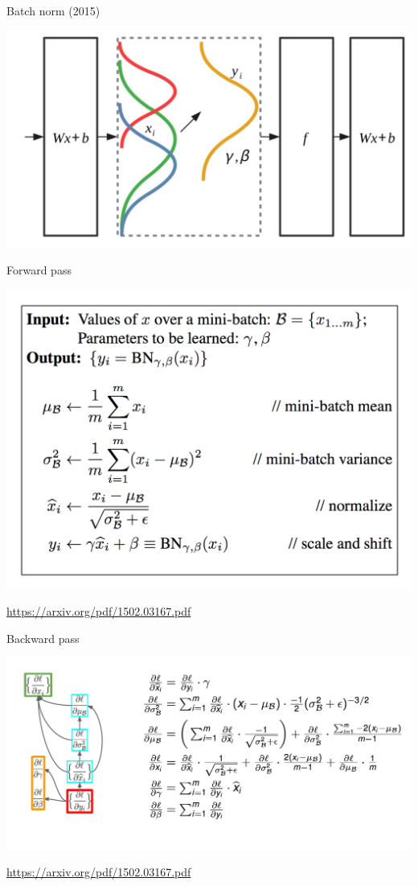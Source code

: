 \documentclass[notes,12pt, aspectratio=169]{beamer}
\begin{document}
\begin{frame}{Batch norm (2015)}
\begin{center}
	\includegraphics[width=.7\linewidth]{distributions_nice.png}
\end{center}
\end{frame}

\begin{frame}{Forward pass}
\begin{center}
	\includegraphics[width=.6\linewidth]{batch_formulas.png}
\end{center}
\vfill %
\footnotesize
{\color{blue} \url{https://arxiv.org/pdf/1502.03167.pdf}}
\end{frame}


\begin{frame}{Backward pass}
\begin{center}
	\includegraphics[width=.95\linewidth]{batch_grad.png}
\end{center}
\vfill %
\footnotesize
{\color{blue} \url{https://arxiv.org/pdf/1502.03167.pdf}}
\end{frame}
\end{document}

